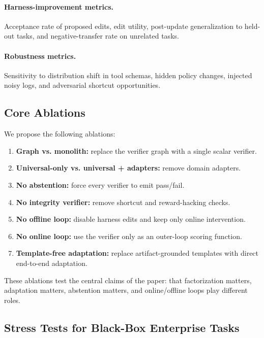 \documentclass{article} %
\begin{document}
\paragraph{Harness-improvement metrics.}
Acceptance rate of proposed edits, edit utility, post-update generalization to held-out tasks, and negative-transfer rate on unrelated tasks.

\paragraph{Robustness metrics.}
Sensitivity to distribution shift in tool schemas, hidden policy changes, injected noisy logs, and adversarial shortcut opportunities.

\subsection{Core Ablations}
\label{subsec:ablations}

We propose the following ablations:
\begin{enumerate}[leftmargin=1.3em]
    \item \textbf{Graph vs. monolith:} replace the verifier graph with a single scalar verifier.
    \item \textbf{Universal-only vs. universal + adapters:} remove domain adapters.
    \item \textbf{No abstention:} force every verifier to emit pass/fail.
    \item \textbf{No integrity verifier:} remove shortcut and reward-hacking checks.
    \item \textbf{No offline loop:} disable harness edits and keep only online intervention.
    \item \textbf{No online loop:} use the verifier only as an outer-loop scoring function.
    \item \textbf{Template-free adaptation:} replace artifact-grounded templates with direct end-to-end adaptation.
\end{enumerate}

These ablations test the central claims of the paper: that factorization matters, adaptation matters, abstention matters, and online/offline loops play different roles.

\subsection{Stress Tests for Black-Box Enterprise Tasks}
\label{subsec:stress}
\end{document}
